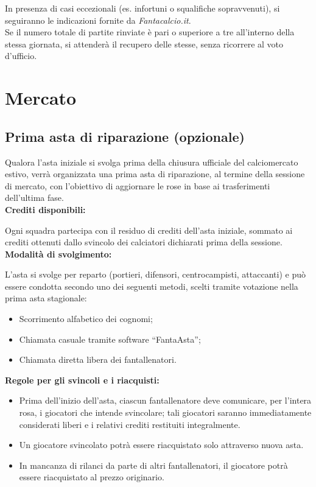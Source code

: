 In presenza di casi eccezionali (es. infortuni o squalifiche sopravvenuti), si seguiranno le indicazioni fornite da \emph{Fantacalcio.it}. \\


Se il numero totale di partite rinviate è pari o superiore a tre all'interno della stessa giornata, si attenderà il recupero delle stesse, senza ricorrere al voto d'ufficio.



\chapter{Mercato}
\label{cap:mercato}

\section{Prima asta di riparazione (opzionale)}
\label{art:6.1}

Qualora l'asta iniziale si svolga prima della chiusura ufficiale del calciomercato estivo, verrà organizzata una prima asta di riparazione, al termine della sessione di mercato, con l'obiettivo di aggiornare le rose in base ai trasferimenti dell'ultima fase. \\

\noindent \textbf{Crediti disponibili:}

Ogni squadra partecipa con il residuo di crediti dell'asta iniziale, sommato ai crediti ottenuti dallo svincolo dei calciatori dichiarati prima della sessione.\\

\noindent \textbf{Modalità di svolgimento:}

L'asta si svolge per reparto (portieri, difensori, centrocampisti, attaccanti) e può essere condotta secondo uno dei seguenti metodi, scelti tramite votazione nella prima asta stagionale:
\begin{itemize}
\item Scorrimento alfabetico dei cognomi;
\item Chiamata casuale tramite software “FantaAsta”;
\item Chiamata diretta libera dei fantallenatori.
\end{itemize}

\noindent \textbf{Regole per gli svincoli e i riacquisti:}
\begin{itemize}
\item Prima dell'inizio dell'asta, ciascun fantallenatore deve comunicare, per l'intera rosa, i giocatori che intende svincolare; tali giocatori saranno immediatamente considerati liberi e i relativi crediti restituiti integralmente.
\item Un giocatore svincolato potrà essere riacquistato solo attraverso nuova asta.
\item In mancanza di rilanci da parte di altri fantallenatori, il giocatore potrà essere riacquistato al prezzo originario.
\end{itemize}

